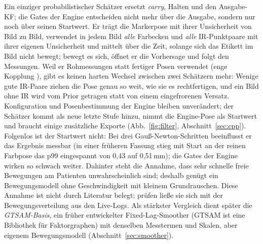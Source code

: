 \documentclass[11pt,a4paper,fleqn]{article}
\begin{document}
Ein einziger probabilistischer Schätzer ersetzt \emph{carry}, Halten und den Ausgabe-KF; die Gates der Engine
entscheiden nicht mehr über die Ausgabe, sondern nur noch über seinen Startwert. Er trägt die
Markerpose mit ihrer Unsicherheit von Bild zu Bild, verwendet in jedem Bild \emph{alle} Farbecken und \emph{alle}
IR-Punktpaare mit ihrer eigenen Unsicherheit und mittelt über die Zeit, solange sich das Etikett im Bild nicht
bewegt; bewegt es sich, öffnet er die Vorhersage und folgt den Messungen. Weil er Rohmessungen statt fertiger
Posen verwendet (enge Kopplung \cite[S.~493]{tobergte2009robust}), gibt es keinen harten Wechsel zwischen zwei
Schätzern mehr: Wenige gute IR-Paare ziehen die Pose genau so weit, wie sie es rechtfertigen, und ein Bild ohne IR
wird vom Prior getragen statt von einem eingefrorenen Versatz. Konfiguration und Posenbestimmung der Engine bleiben
unverändert; der Schätzer kommt als neue letzte Stufe hinzu, nimmt die Engine-Pose als Startwert und braucht einige
zusätzliche Exporte (Abb.~\ref{fig:filter}, Abschnitt~\ref{sec:cpp}). Folgenlos ist der Startwert nicht: Bei drei
Gauß-Newton-Schritten beeinflusst er das Ergebnis messbar (in einer früheren Fassung stieg mit Start an der
reinen Farbpose das p99 eingespannt von 0,43 auf 0,51\,mm); die Gates der Engine wirken so schwach weiter. Dahinter steht die Annahme, dass sehr schnelle freie Bewegungen am Patienten unwahrscheinlich
sind; deshalb genügt ein Bewegungsmodell ohne Geschwindigkeit mit kleinem Grundrauschen. Diese Annahme ist nicht
durch Literatur belegt; prüfen ließe sie sich mit der Bewegungsverteilung aus den Live-Logs. Als stärkster
Vergleich dient später die \emph{GTSAM-Basis}, ein früher entwickelter Fixed-Lag-Smoother (GTSAM ist eine
Bibliothek für Faktorgraphen) mit denselben Messtermen und Skalen, aber eigenem Bewegungsmodell
(Abschnitt~\ref{sec:smoother}).
\end{document}
